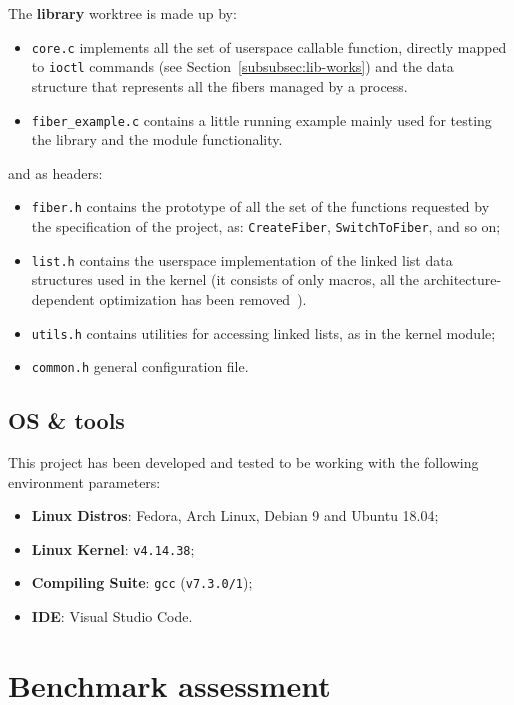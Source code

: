 \documentclass[a4paper,10pt]{article}
\begin{document}
  The \textbf{library} worktree is made up by:
  \begin{itemize}
    \item \lstinline{core.c} implements all the set of userspace callable function, directly mapped to \lstinline{ioctl} commands (see Section~\ref{subsubsec:lib-works}) and the data structure that represents all the fibers managed by a process.
    \item \lstinline{fiber_example.c} contains a little running example mainly used for testing the library and the module functionality.
  \end{itemize}
  and as headers:
  \begin{itemize}
    \item \lstinline{fiber.h} contains the prototype of all the set of the functions requested by the specification of the project, as: \lstinline{CreateFiber}, \lstinline{SwitchToFiber}, and so on;
    \item \lstinline{list.h} contains the userspace implementation of the linked list data structures used in the kernel (it consists of only macros, all the architecture-dependent optimization has been removed~\cite{klists}).
    \item \lstinline{utils.h} contains utilities for accessing linked lists, as in the kernel module;
    \item \lstinline{common.h} general configuration file.
  \end{itemize}


\subsection{OS \& tools}
  This project has been developed and tested to be working with the following environment parameters:
  \begin{itemize}
    \item \textbf{Linux Distros}: Fedora, Arch Linux, Debian 9 and Ubuntu 18.04;
    \item \textbf{Linux Kernel}: \lstinline{v4.14.38};
    \item \textbf{Compiling Suite}: \lstinline{gcc} (\lstinline{v7.3.0/1});
    \item \textbf{IDE}: Visual Studio Code.
  \end{itemize}

\section{Benchmark assessment}
\end{document}
